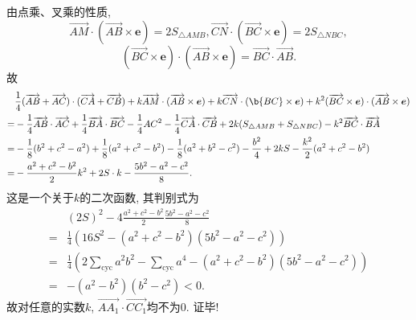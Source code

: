 \documentclass{article}
\newcommand\bo[1]{\boldsymbol{#1}}
\renewcommand\v[1]{\overrightarrow{#1}}
\begin{document}
由点乘、叉乘的性质,
\[\v{AM}\cdot(\v{AB}\times\bo{e})=2S_{\triangle AMB},\v{CN}\cdot(\v{BC}\times\bo e)=2S_{\triangle NBC},\]
\[(\v{BC}\times\bo e)\cdot(\v{AB}\times\bo e)=\v{BC}\cdot\v{AB}.\]
故
\begin{align*}
&\frac14(\v{AB}+\v{AC})\cdot(\v{CA}+\v{CB})+k\v{AM}\cdot(\v{AB}\times\bo{e})+k\v{CN}\cdot(\b{BC}\times\bo e)+k^2(\v{BC}\times\bo e)\cdot(\v{AB}\times\bo e)\\
=&-\frac14\v{AB}\cdot\v{AC}+\frac14\v{BA}\cdot\v{BC}-\frac14AC^2-\frac14\v{CA}\cdot\v{CB}+2k(S_{\triangle AMB}+S_{\triangle NBC})-k^2\v{BC}\cdot\v{BA}\\
=&-\frac18(b^2+c^2-a^2)+\frac18(a^2+c^2-b^2)-\frac18(a^2+b^2-c^2)-\frac{b^2}{4}+2kS-\frac{k^2}{2}(a^2+c^2-b^2)\\
=&-\frac{a^2+c^2-b^2}{2}k^2+2S\cdot k-\frac{5b^2-a^2-c^2}{8}
.\end{align*}
这是一个关于$k$的二次函数, 其判别式为
\begin{align*}
&(2S)^2-4\frac{a^2+c^2-b^2}{2}\frac{5b^2-a^2-c^2}{8}\\
=&\frac14\left(16S^2-(a^2+c^2-b^2)(5b^2-a^2-c^2)\right)\\
=&\frac14\left(2\sum_{\mathrm{cyc}}a^2b^2-\sum_{\mathrm{cyc}}a^4-(a^2+c^2-b^2)(5b^2-a^2-c^2)\right)\\
=&-\left(a^2-b^2\right)\left(b^2-c^2\right)<0.
\end{align*}
故对任意的实数$k$, $\v{AA_1}\cdot\v{CC_1}$均不为$0$. 证毕!
\end{document}
